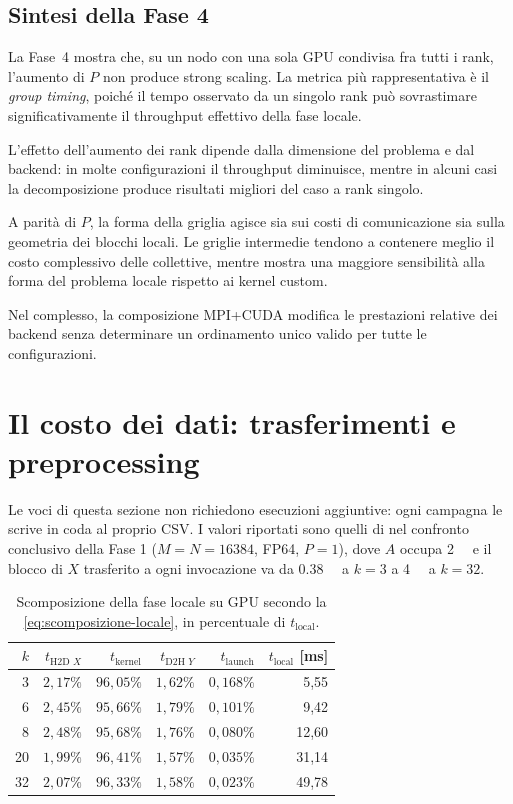\subsection{Sintesi della Fase 4}
\label{sec:ris-fase4-sintesi}

La Fase~4 mostra che, su un nodo con una sola GPU condivisa fra tutti i rank,
l'aumento di $P$ non produce strong scaling. La metrica più rappresentativa è
il \emph{group timing}, poiché il tempo osservato da un singolo rank può
sovrastimare significativamente il throughput effettivo della fase locale.

L'effetto dell'aumento dei rank dipende dalla dimensione del problema e dal
backend: in molte configurazioni il throughput diminuisce, mentre in alcuni
casi la decomposizione produce risultati migliori del caso a rank singolo.

A parità di $P$, la forma della griglia agisce sia sui costi di comunicazione
sia sulla geometria dei blocchi locali. Le griglie intermedie tendono a
contenere meglio il costo complessivo delle collettive, mentre
 mostra una maggiore sensibilità alla forma del problema
locale rispetto ai kernel custom.

Nel complesso, la composizione MPI+CUDA modifica le prestazioni relative dei
backend senza determinare un ordinamento unico valido per tutte le
configurazioni.

\section{Il costo dei dati: trasferimenti e preprocessing}
\label{sec:ris-trasferimenti}

Le voci di questa sezione non richiedono esecuzioni aggiuntive: ogni campagna
le scrive in coda al proprio CSV. I valori riportati sono quelli di
 nel confronto conclusivo della Fase 1
($M=N=\num{16384}$, FP64, $P=1$), dove $A$ occupa \SI{2}{\gibi\byte} e il blocco di $X$ trasferito a
ogni invocazione va da \SI{0.38}{\mebi\byte} a $k = 3$ a \SI{4}{\mebi\byte} a
$k = 32$.

\begin{table}[H]
\centering
\footnotesize
\caption{Scomposizione della fase locale su GPU secondo la
\cref{eq:scomposizione-locale}, in percentuale di $t_{\text{local}}$.}
\label{tab:ris-scomposizione}
\begin{tabular}{@{}rrrrrr@{}}
\toprule
$k$ & $t_{\text{H2D }X}$ & $t_{\text{kernel}}$ & $t_{\text{D2H }Y}$ & $t_{\text{launch}}$ & $t_{\text{local}}$ [\si{\milli\second}] \\
\midrule
3  & $2{,}17\%$ & $96{,}05\%$ & $1{,}62\%$ & $0{,}168\%$ & 5,55 \\
6  & $2{,}45\%$ & $95{,}66\%$ & $1{,}79\%$ & $0{,}101\%$ & 9,42 \\
8  & $2{,}48\%$ & $95{,}68\%$ & $1{,}76\%$ & $0{,}080\%$ & 12,60 \\
20 & $1{,}99\%$ & $96{,}41\%$ & $1{,}57\%$ & $0{,}035\%$ & 31,14 \\
32 & $2{,}07\%$ & $96{,}33\%$ & $1{,}58\%$ & $0{,}023\%$ & 49,78 \\
\bottomrule
\end{tabular}
\end{table}


